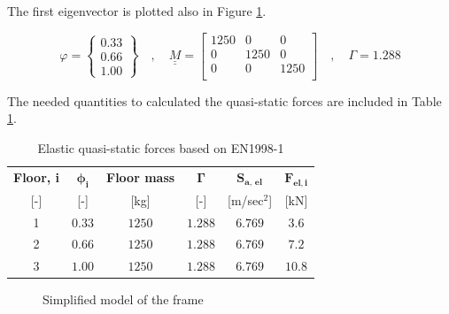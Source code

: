 The first eigenvector is plotted also in Figure \ref{simpleFrame}.

\vspace{0.2cm}

\begin{equation*}
    \varphi =
    \begin{Bmatrix}
        0.33\\
        0.66\\
        1.00
    \end{Bmatrix}
    \quad , \quad
    \underline{\underline{M}} =
    \begin{bmatrix}
    1250 & 0 & 0 \\
    0 & 1250 & 0 \\
    0 & 0 & 1250 \\
    \end{bmatrix}
    \quad , \quad 
    \Gamma = 1.288
\end{equation*}

\vspace{0.5cm}

\newpage

The needed quantities to calculated the quasi-static forces are included in Table \ref{elasticForces}.

\begin{table}[H]
    \centering
    \caption{Elastic quasi-static forces based on EN1998-1 \cite{EC8}}
    \label{elasticForces}
    \begin{tabular}{cccccc}
        \toprule
        \textbf{Floor, i} & $\boldsymbol{\phi _{i}}$ & \textbf{Floor mass} & $\boldsymbol{\Gamma }$ & $\boldsymbol{S_{a,\,\text{el}}}$ & $\boldsymbol{F_{\text{el,}\,i}}$ \\
        {[}-{]} & {[}-{]} & {[}kg{]} & {[}-{]} & {[}m/sec$^2${]} & {[}kN{]} \\
        \midrule
        1 & $0.33$ & $1250$ & $1.288$ & $6.769$ & $3.6$ \\
        2 & $0.66$ & $1250$ & $1.288$ & $6.769$ & $7.2$ \\
        3 & $1.00$ & $1250$ & $1.288$ & $6.769$ & $10.8$ \\
        \bottomrule
    \end{tabular}
\end{table}

\begin{figure}[H]
    \centering
	\caption{Simplified model of the frame}
	\label{simpleFrame}
\end{figure}


